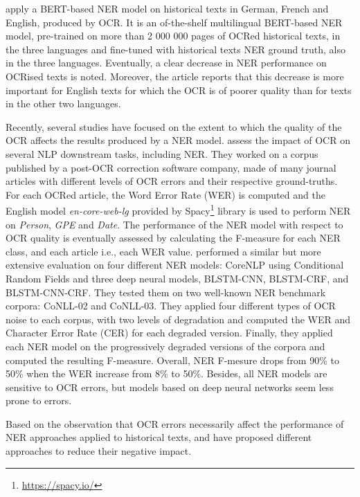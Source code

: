 \cite{Labusch2020NamedED} apply a BERT-based NER model on historical texts in German, French and English, produced by OCR. It is an of-the-shelf multilingual BERT-based NER model, pre-trained on more than 2 000 000 pages of OCRed historical texts, in the three languages and fine-tuned with historical texts NER ground truth, also in the three languages. Eventually, a clear decrease in NER performance on OCRised texts is noted. Moreover, the article reports that this decrease is more important for English texts for which the OCR is of poorer quality than for texts in the other two languages. 

Recently, several studies have focused on the extent to which the quality of the OCR affects the results produced by a NER model.\cite{van2020assessing} assess the impact of OCR on several NLP downstream tasks, including NER. They worked on a corpus published by a post-OCR correction software company, made of many journal articles with different levels of OCR errors and their respective ground-truths. For each OCRed article, the Word Error Rate (WER) is computed and the English model \textit{en-core-web-lg} provided by Spacy\footnote{\url{https://spacy.io/}} library is used to perform NER on \textit{Person}, \textit{GPE} and \textit{Date}. The performance of the NER model with respect to OCR quality is eventually assessed by calculating the F-measure for each NER class, and each article i.e., each WER value. \cite{hamdi2020assessing} performed a similar but more extensive evaluation on four different NER models: CoreNLP using Conditional Random Fields and three deep neural models, BLSTM-CNN, BLSTM-CRF, and BLSTM-CNN-CRF. They tested them on two well-known NER benchmark corpora: CoNLL-02 and CoNLL-03. They applied four different types of OCR noise to each corpus, with two levels of degradation and computed the WER and Character Error Rate (CER) for each degraded version. Finally, they applied each NER model on the progressively degraded versions of the corpora and computed the resulting F-measure. Overall, NER F-mesure drops from 90\% to 50\% when the WER increase from 8\% to 50\%. Besides, all NER models are sensitive to OCR errors, but models based on deep neural networks seem less prone to errors.

Based on the observation that OCR errors necessarily affect the performance of NER approaches applied to historical texts, \cite{huynh2020use} and \cite{marz2021data} have proposed different approaches to reduce their negative impact.





